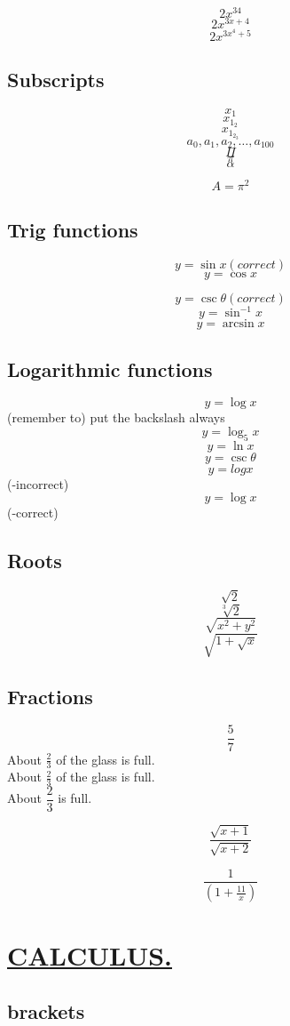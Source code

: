 \documentclass[a4paper,12pt]{article}
\begin{document}
	$$2x^{34}$$
	$$2x^{3x+4}$$
	$$2x^{3x^4+5}$$
	
	\subsection{Subscripts}
	
	$$x_1$$
	$$x_{1_{2}}$$
	$$x_{1_{2_3}}$$
	$$a_0,a_1,a_2,\ldots,a_{100}$$
	$$\Pi$$
	$$\pi$$
	$$\alpha$$
	
	$$A=\pi ^2$$
	
	\subsection{Trig  functions}
	$$y=\sin x(correct)$$
	$$y=\cos x$$
	
	$$y=\csc \theta(correct)$$
	$$y=\sin^{-1} x$$
	$$y=\arcsin x$$
	\subsection{Logarithmic functions}
	$$y=\log x$$(remember to) put the backslash always
	$$y=\log_5 x$$
	$$y=\ln x$$
   $$y=\csc \theta$$
   $$y=logx$$ (-incorrect)
	$$y=\log x$$ (-correct)
	
	\subsection{Roots}
	
	$$\sqrt{2}$$
	$$\sqrt[3]{2}$$
	$$\sqrt{x^2+y^2}$$
	$$\sqrt{1+\sqrt{x}}$$
	
	\subsection{Fractions}
	
	$$\frac{5}{7}$$
	About $\displaystyle \frac{2}{3}$ of the glass is full.\\[16pt]
	About $\frac{2}{3}$ of the glass is full.\\[6pt]
   About $\dfrac{2}{3}$ is full.
   
   $$\frac{\sqrt{x+1}}{\sqrt{x+2}}$$
  
  $$\frac{1}{   (1+\frac{11}{x})    }$$
  
  \section{\underline{CALCULUS.}}
  \subsection{brackets}
\end{document}

